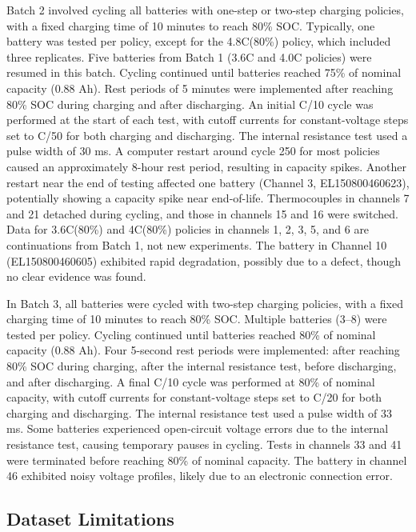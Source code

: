 Batch 2 involved cycling all batteries with one-step or two-step charging policies, with a fixed charging time of 10 minutes to reach 80\% SOC. Typically, one battery was tested per policy, except for the 4.8C(80\%) policy, which included three replicates. Five batteries from Batch 1 (3.6C and 4.0C policies) were resumed in this batch. Cycling continued until batteries reached 75\% of nominal capacity (0.88 Ah). Rest periods of 5 minutes were implemented after reaching 80\% SOC during charging and after discharging. An initial C/10 cycle was performed at the start of each test, with cutoff currents for constant-voltage steps set to C/50 for both charging and discharging. The internal resistance test used a pulse width of 30 ms. A computer restart around cycle 250 for most policies caused an approximately 8-hour rest period, resulting in capacity spikes. Another restart near the end of testing affected one battery (Channel 3, EL150800460623), potentially showing a capacity spike near end-of-life. Thermocouples in channels 7 and 21 detached during cycling, and those in channels 15 and 16 were switched. Data for 3.6C(80\%) and 4C(80\%) policies in channels 1, 2, 3, 5, and 6 are continuations from Batch 1, not new experiments. The battery in Channel 10 (EL150800460605) exhibited rapid degradation, possibly due to a defect, though no clear evidence was found.

In Batch 3, all batteries were cycled with two-step charging policies, with a fixed charging time of 10 minutes to reach 80\% SOC. Multiple batteries (3–8) were tested per policy. Cycling continued until batteries reached 80\% of nominal capacity (0.88 Ah). Four 5-second rest periods were implemented: after reaching 80\% SOC during charging, after the internal resistance test, before discharging, and after discharging. A final C/10 cycle was performed at 80\% of nominal capacity, with cutoff currents for constant-voltage steps set to C/20 for both charging and discharging. The internal resistance test used a pulse width of 33 ms. Some batteries experienced open-circuit voltage errors due to the internal resistance test, causing temporary pauses in cycling. Tests in channels 33 and 41 were terminated before reaching 80\% of nominal capacity. The battery in channel 46 exhibited noisy voltage profiles, likely due to an electronic connection error.

\subsection{Dataset Limitations} \label{sec:batch_desc__dataset-lims}

